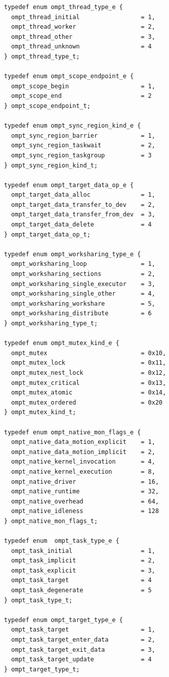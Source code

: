 \documentclass{article}
\begin{document}
{\begin{verbatim}
typedef enum ompt_thread_type_e {
  ompt_thread_initial                 = 1,
  ompt_thread_worker                  = 2,
  ompt_thread_other                   = 3,
  ompt_thread_unknown                 = 4
} ompt_thread_type_t;

typedef enum ompt_scope_endpoint_e {
  ompt_scope_begin                    = 1,
  ompt_scope_end                      = 2
} ompt_scope_endpoint_t;

typedef enum ompt_sync_region_kind_e {
  ompt_sync_region_barrier            = 1, 
  ompt_sync_region_taskwait           = 2,
  ompt_sync_region_taskgroup          = 3
} ompt_sync_region_kind_t;

typedef enum ompt_target_data_op_e {
  ompt_target_data_alloc              = 1,
  ompt_target_data_transfer_to_dev    = 2,
  ompt_target_data_transfer_from_dev  = 3,
  ompt_target_data_delete             = 4
} ompt_target_data_op_t;

typedef enum ompt_worksharing_type_e {
  ompt_worksharing_loop               = 1, 
  ompt_worksharing_sections           = 2,
  ompt_worksharing_single_executor    = 3,
  ompt_worksharing_single_other       = 4,
  ompt_worksharing_workshare          = 5,
  ompt_worksharing_distribute         = 6
} ompt_worksharing_type_t;

typedef enum ompt_mutex_kind_e {
  ompt_mutex                          = 0x10,
  ompt_mutex_lock                     = 0x11,
  ompt_mutex_nest_lock                = 0x12,
  ompt_mutex_critical                 = 0x13,
  ompt_mutex_atomic                   = 0x14,
  ompt_mutex_ordered                  = 0x20
} ompt_mutex_kind_t;

typedef enum ompt_native_mon_flags_e {
  ompt_native_data_motion_explicit    = 1,
  ompt_native_data_motion_implicit    = 2,
  ompt_native_kernel_invocation       = 4,
  ompt_native_kernel_execution        = 8,
  ompt_native_driver                  = 16,
  ompt_native_runtime                 = 32,
  ompt_native_overhead                = 64,
  ompt_native_idleness                = 128
} ompt_native_mon_flags_t;

typedef enum  ompt_task_type_e {
  ompt_task_initial                   = 1,
  ompt_task_implicit                  = 2,
  ompt_task_explicit                  = 3,
  ompt_task_target                    = 4
  ompt_task_degenerate                = 5
} ompt_task_type_t;

typedef enum ompt_target_type_e {
  ompt_task_target                    = 1,
  ompt_task_target_enter_data         = 2,
  ompt_task_target_exit_data          = 3,
  ompt_task_target_update             = 4
} ompt_target_type_t;


\end{verbatim}}
\end{document}
